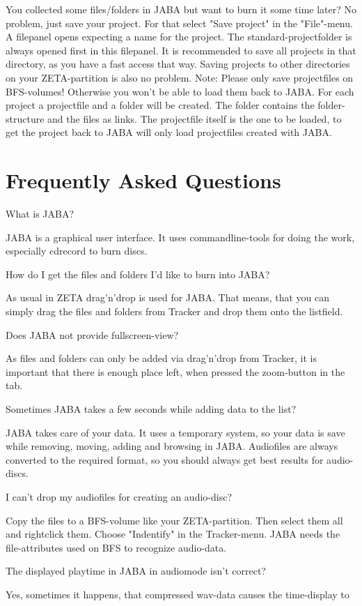 \documentclass[a4paper,11pt]{article}
\begin{document}
You collected some files/folders in JABA but want to burn it some time later?
No problem, just save your project. For that select "Save project" in the "File"-menu. A
filepanel opens expecting a name for the project.
The standard-projectfolder is always opened first in this filepanel. It is recommended to
save all projects in that directory, as you have a fast access that way.
Saving projects to other directories on your ZETA-partition is also no problem.
Note:
Please only save projectfiles on BFS-volumes! Otherwise you won't be able to load them
back to JABA.
For each project a projectfile and a folder will be created. The folder contains the
folder-structure and the files as links. The projectfile itself is the one to be loaded, to get
the project back to
JABA will only load projectfiles created with JABA.

\section{Frequently Asked Questions}

What is JABA?

      JABA is a graphical user interface. It uses commandline-tools for doing the work,
      especially cdrecord to burn discs.

How do I get the files and folders I'd like to burn into JABA?

      As usual in ZETA drag'n'drop is used for JABA. That means, that you can simply
      drag the files and folders from Tracker and drop them onto the listfield.

Does JABA not provide fullscreen-view?

      As files and folders can only be added via drag'n'drop from Tracker, it is important
      that there is enough place left, when pressed the zoom-button in the tab.

Sometimes JABA takes a few seconds while adding data to the list?

      JABA takes care of your data. It uses a temporary system, so your data is save
while
      removing, moving, adding and browsing in JABA.
      Audiofiles are always converted to the required format, so you should
      always get best results for audio-discs.

I can't drop my audiofiles for creating an audio-disc?

      Copy the files to a BFS-volume like your ZETA-partition. Then select them all
and
      rightclick them. Choose "Indentify" in the Tracker-menu.
      JABA needs the file-attributes used on BFS to recognize audio-data.

The displayed playtime in JABA in audiomode isn't correct?

      Yes, sometimes it happens, that compressed wav-data causes the time-display to
\end{document}

